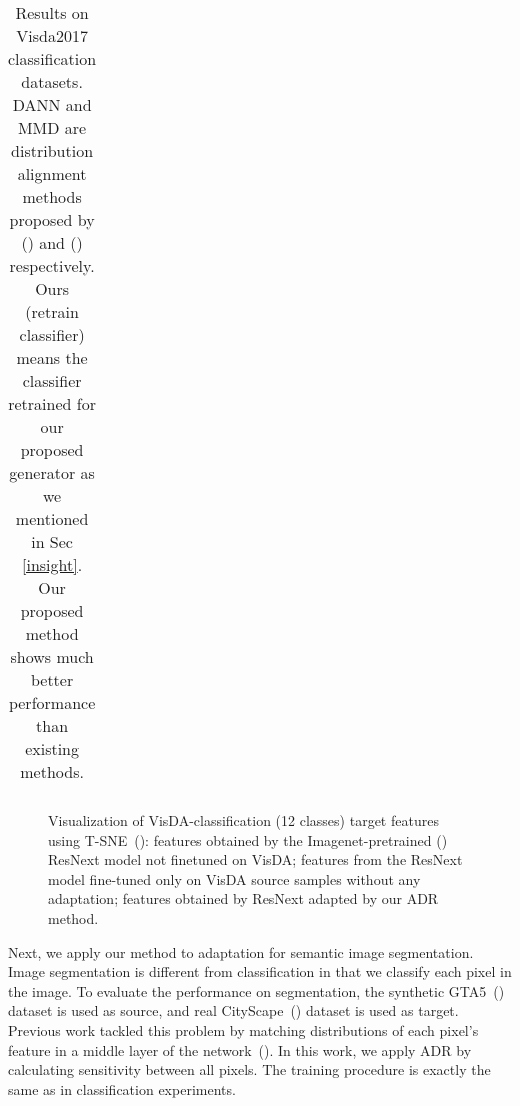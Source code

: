 \documentclass{article} \usepackage{iclr2018_conference,times}
\begin{document}
\begin{table}[t]
{\begin{center}
{\begin{tabular}{l|cccccccccccc|c}
 \hline
  \end{tabular}}
  \vspace{-2mm}
    \caption{{\small Results on Visda2017 classification datasets. DANN and MMD are distribution alignment methods proposed by (\cite{ganin2014unsupervised}) and (\cite{long2015learning}) respectively. Ours (retrain classifier) means the classifier retrained for our proposed generator as we mentioned in Sec \ref{insight}. Our proposed method shows much better performance than existing methods.} }
    \label{table:exp_class}
      \end{center}
  }
\vspace{-3mm} 
\end{table}


\begin{figure}[tb]
\vspace{-4mm}
\centering
\begin{minipage}{0.3\hsize}
  \centering
\end{minipage}
\begin{minipage}{0.3\hsize}
  \centering
\end{minipage}
\begin{minipage}{0.3\hsize}
  \centering
\end{minipage}
\vspace{-2mm}
\caption{\small Visualization of VisDA-classification (12 classes) target features using T-SNE~(\cite{maaten2008visualizing}): {\bf {}} features obtained by the Imagenet-pretrained (\cite{deng2009imagenet}) ResNext model not finetuned on VisDA; {\bf {}} features from the ResNext model fine-tuned only on VisDA source samples without any adaptation; {\bf {}} features obtained by ResNext adapted by our ADR method.}
\label{fig:embedding}
\end{figure}

Next, we apply our method to adaptation for semantic image segmentation. Image segmentation is different from classification in that we classify each pixel in the image. To evaluate the performance on segmentation, the synthetic GTA5~(\cite{richter2016playing}) dataset is used as source, and real CityScape~(\cite{cordts2016cityscapes}) dataset is used as target. Previous work tackled this problem by matching distributions of each pixel's feature in a middle layer of the network~(\cite{hoffman2016fcns}).
In this work, we apply ADR by calculating sensitivity between all pixels. The training procedure is exactly the same as in classification experiments. 
\end{document}
